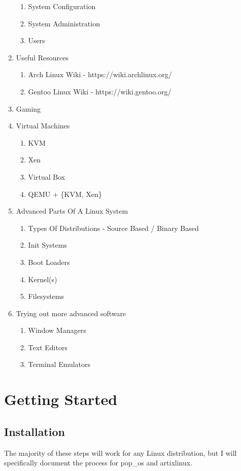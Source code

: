 \documentclass {report}
\begin{document}
\begin{enumerate}
\begin{enumerate}
      \item System Configuration
      \item System Administration
      \item Users
    \end{enumerate}
  \item Useful Resources
    \begin{enumerate}
      \item Arch Linux Wiki - https://wiki.archlinux.org/
      \item Gentoo Linux Wiki - https://wiki.gentoo.org/
    \end{enumerate}
  \item Gaming
  \item Virtual Machines
    \begin{enumerate}
      \item KVM
      \item Xen
      \item Virtual Box
      \item QEMU + \{KVM, Xen\}
    \end{enumerate}
  \item Advanced Parts Of A Linux System
    \begin{enumerate}
      \item Types Of Distributions - Source Based / Binary Based
      \item Init Systems
      \item Boot Loaders
      \item Kernel(s)
      \item Filesystems
    \end{enumerate}
  \item Trying out more advanced software
    \begin{enumerate}
      \item Window Managers
      \item Text Editors
      \item Terminal Emulators
    \end{enumerate}
\end{enumerate}

\chapter{Getting Started}
\section{Installation}
The majority of these steps will work for any Linux distribution, but I will specifically document the process for pop_os and artixlinux.
\end{document}

